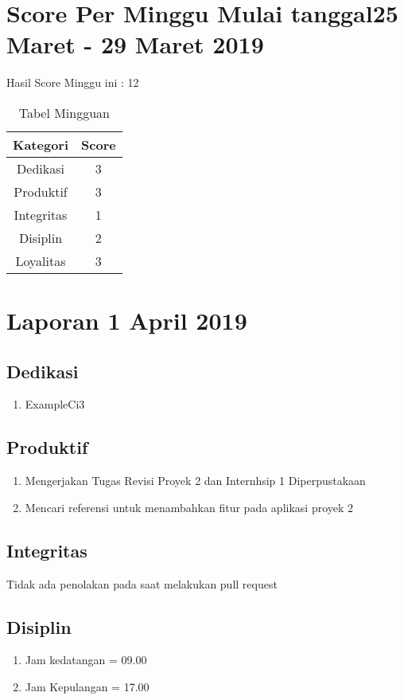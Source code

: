 \section {Score Per Minggu Mulai tanggal25  Maret - 29 Maret 2019}
Hasil Score Minggu ini : 12
\begin{table}[h]
\caption{Tabel Mingguan}
\centering
\begin{tabular}{|c|c|}
\hline
\textbf{Kategori}&\textbf{Score}\\
\hline
Dedikasi&3\\
\hline
Produktif&3\\
\hline
Integritas&1\\
\hline
Disiplin&2\\
\hline
Loyalitas&3\\
\hline
\end{tabular}
\label{tsble:Laporan mingguan}
\end{table}

\section{Laporan 1 April 2019}
\subsection{Dedikasi}
\begin{enumerate}
\item ExampleCi3
\end{enumerate}
\subsection{Produktif}
\begin{enumerate}
\item Mengerjakan Tugas Revisi Proyek 2 dan Internhsip 1 Diperpustakaan
\item Mencari referensi untuk menambahkan fitur pada aplikasi proyek 2
\end{enumerate}
\subsection{Integritas}
Tidak ada penolakan pada saat melakukan pull request
\subsection{Disiplin}
\begin{enumerate}
\item Jam kedatangan =  09.00
\item Jam Kepulangan = 17.00
\end{enumerate}
